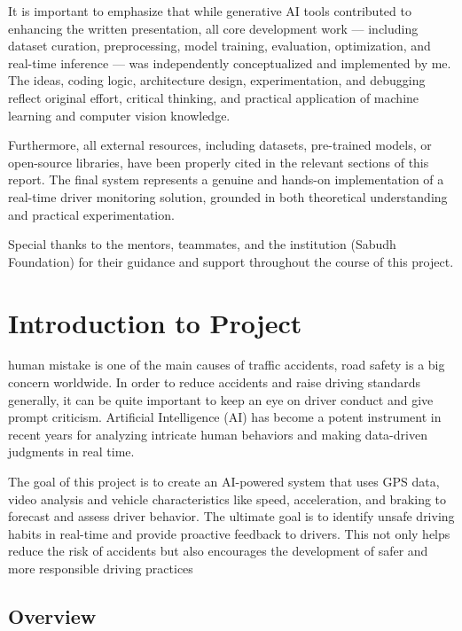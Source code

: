 \documentclass[
  letterpaper,
  DIV=11,
  numbers=noendperiod]{scrreport}
\begin{document}
It is important to emphasize that while generative AI tools contributed
to enhancing the written presentation, all core development work ---
including dataset curation, preprocessing, model training, evaluation,
optimization, and real-time inference --- was independently
conceptualized and implemented by me. The ideas, coding logic,
architecture design, experimentation, and debugging reflect original
effort, critical thinking, and practical application of machine learning
and computer vision knowledge.

Furthermore, all external resources, including datasets, pre-trained
models, or open-source libraries, have been properly cited in the
relevant sections of this report. The final system represents a genuine
and hands-on implementation of a real-time driver monitoring solution,
grounded in both theoretical understanding and practical
experimentation.

Special thanks to the mentors, teammates, and the institution (Sabudh
Foundation) for their guidance and support throughout the course of this
project.


\chapter{Introduction to Project}\label{introduction-to-project}

human mistake is one of the main causes of traffic accidents, road
safety is a big concern worldwide. In order to reduce accidents and
raise driving standards generally, it can be quite important to keep an
eye on driver conduct and give prompt criticism. Artificial Intelligence
(AI) has become a potent instrument in recent years for analyzing
intricate human behaviors and making data-driven judgments in real time.

The goal of this project is to create an AI-powered system that uses GPS
data, video analysis and vehicle characteristics like speed,
acceleration, and braking to forecast and assess driver behavior. The
ultimate goal is to identify unsafe driving habits in real-time and
provide proactive feedback to drivers. This not only helps reduce the
risk of accidents but also encourages the development of safer and more
responsible driving practices

\section{Overview}\label{overview}
\end{document}

